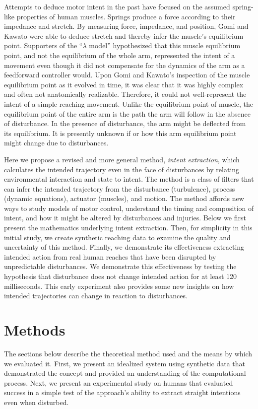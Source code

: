 Attempts to deduce motor intent in the past have focused on the assumed spring-like properties of human muscles. Springs produce a force according to their impedance and stretch. By measuring force, impedance, and position, Gomi and Kawato\cite{gomi1997human} were able to deduce stretch and thereby infer the muscle's equilibrium point. Supporters of the ``$\lambda$ model''\cite{feldman1995origin} hypothesized that this muscle equilibrium point, and not the equilibrium of the whole arm, represented the intent of a movement even though it did not compensate for the dynamics of the arm as a feedforward controller would. Upon Gomi and Kawato's inspection of the muscle equilibrium point as it evolved in time, it was clear that it was highly complex and often not anatomically realizable. Therefore, it could not well-represent the intent of a simple reaching movement. Unlike the equilibrium point of muscle, the equilibrium point of the entire arm is the path the arm will follow in the absence of disturbance. In the presence of disturbance, the arm might be deflected from its equilibrium. It is presently unknown if or how this arm equilibrium point might change due to disturbances.

Here we propose a revised and more general method, \textit{intent extraction}, which calculates the intended trajectory even in the face of disturbances by relating environmental interaction and state to intent. The method is a class of filters that can infer the intended trajectory from the disturbance (turbulence), process (dynamic equations), actuator (muscles), and motion. The method affords new ways to study models of motor control, understand the timing and composition of intent, and how it might be altered by disturbances and injuries. Below we first present the mathematics underlying intent extraction. Then, for simplicity in this initial study, we create synthetic reaching data to examine the quality and uncertainty of this method. Finally, we demonstrate its effectiveness extracting intended action from real human reaches that have been disrupted by unpredictable disturbances. We demonstrate this effectiveness by testing the hypothesis that disturbance does not change intended action for at least 120 milliseconds. This early experiment also provides some new insights on how intended trajectories can change in reaction to disturbances. 

\section*{Methods}
The sections below describe the theoretical method used and the means by which we evaluated it. First, we present an idealized system using synthetic data that demonstrated the concept and provided an understanding of the computational process. Next, we present an experimental study on humans that evaluated success in a simple test of the approach's ability to extract straight intentions even when disturbed. 

